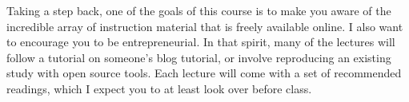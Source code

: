 \documentclass[12]{article}
\begin{document}
% 

Taking a step back, one of the goals of this course is to make you aware of the incredible array of instruction material that is freely available online. I also want to encourage you to be entrepreneurial. In that spirit, many of the lectures will follow a tutorial on someone's blog tutorial, or involve reproducing an existing study with open source tools. Each lecture will come with a set of recommended readings, which I expect you to at least look over before class.
\end{document}
